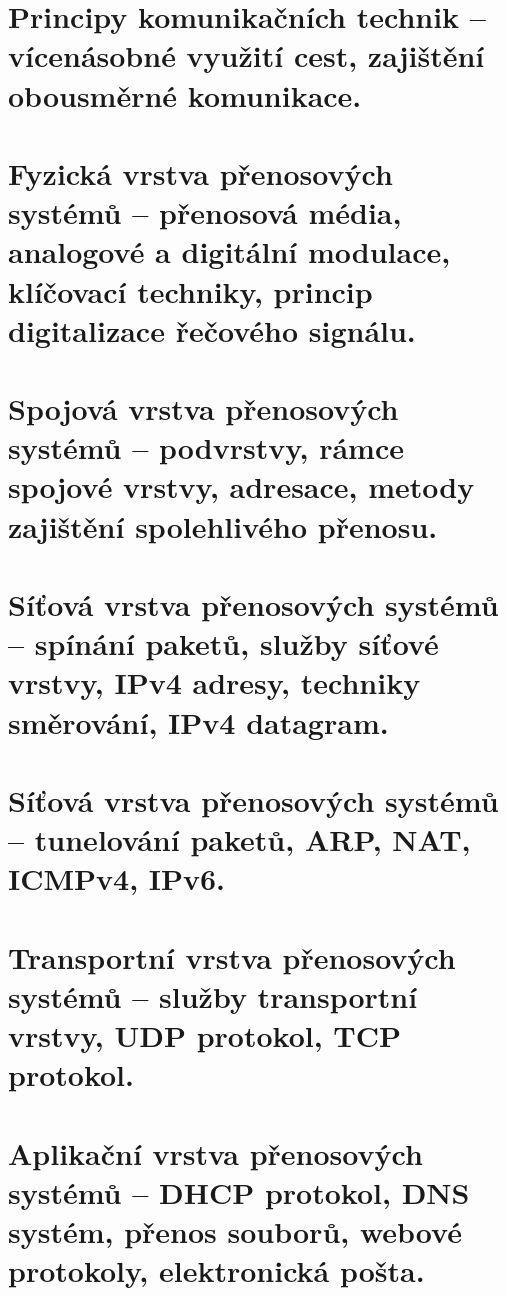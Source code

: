 \clearpage
\section{Principy komunikačních technik -- vícenásobné využití cest, zajištění obousměrné komunikace.}

\clearpage
\section{Fyzická vrstva přenosových systémů -- přenosová média, analogové a digitální modulace, klíčovací techniky, princip digitalizace řečového signálu.}

\clearpage
\section{Spojová vrstva přenosových systémů -- podvrstvy, rámce spojové vrstvy, adresace, metody zajištění spolehlivého přenosu.}

\clearpage
\section{Síťová vrstva přenosových systémů -- spínání paketů, služby síťové vrstvy, IPv4 adresy, techniky směrování, IPv4 datagram.}

\clearpage
\section{Síťová vrstva přenosových systémů -- tunelování paketů, ARP, NAT, ICMPv4, IPv6.}

\clearpage
\section{Transportní vrstva přenosových systémů -- služby transportní vrstvy, UDP protokol, TCP protokol.}

\clearpage
\section{Aplikační vrstva přenosových systémů -- DHCP protokol, DNS systém, přenos souborů, webové protokoly, elektronická pošta.}
